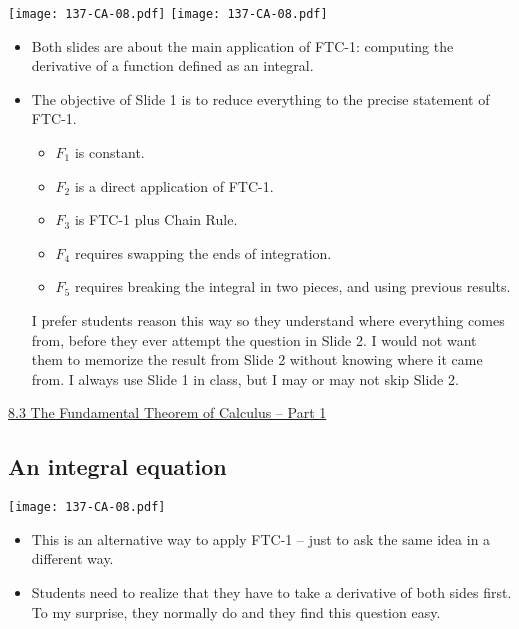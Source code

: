 \documentclass[11pt]{article}
\newcommand{\nl}{\hfill \vspace{-1.1\baselineskip}} %
\newcommand{\viii}{\hspace{8mm} \href{https://www.youtube.com/watch?v=JeKCipoy8bc&list=PLlwePzQY_wW_8-sITAbG_GU2JgiuwXkDN&index=3}{8.3 The Fundamental Theorem of Calculus -- Part 1}}
\begin{document}
\begin{center}
{ \texttt{[image: 137-CA-08.pdf]}} \quad
{ \texttt{[image: 137-CA-08.pdf]}}
\end{center}

\begin{comments}
\nl
	\begin{itemize}
		\item Both slides are about the main application of FTC-1:  computing the derivative of a function defined as an integral.
		\item  The objective of Slide 1 is to reduce everything to the precise statement of FTC-1.
			\begin{itemize}
				\item $F_1$ is constant.
				\item $F_2$ is a direct application of FTC-1.
				\item $F_3$ is FTC-1 plus Chain Rule.
				\item $F_4$ requires swapping the ends of integration.
				\item $F_5$ requires breaking the integral in two pieces, and using previous results.
			\end{itemize}
			I prefer students reason this way so they understand where everything comes from, before they ever attempt the question in Slide 2.  I would not want them to memorize the result from Slide 2 without knowing where it came from.  I always use Slide 1 in class, but I may or may not skip Slide 2.
	\end{itemize}
\end{comments}

\begin{videos}
\viii
\end{videos}

\newpage


\subsection{An integral equation}

\begin{center}
{ \texttt{[image: 137-CA-08.pdf]}} 
\end{center}

\begin{comments}
\nl
	\begin{itemize}
		\item This is an alternative way to apply FTC-1 -- just to ask the same idea in a different way.   
		\item Students need to realize that they have to take a derivative of both sides first.  To my surprise, they normally do and they find this question easy.
	\end{itemize}
\end{comments}
\end{document}
